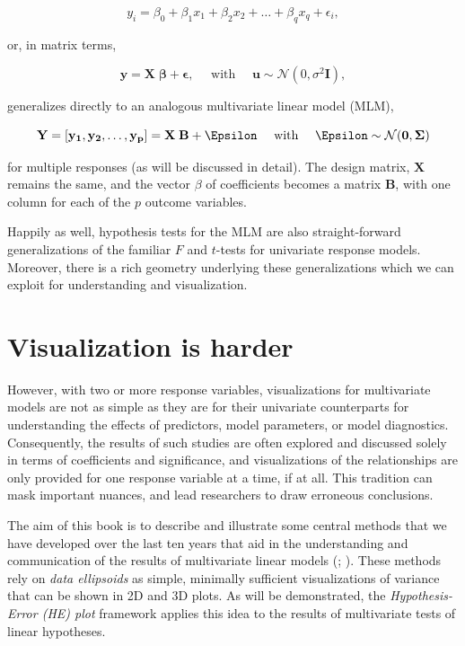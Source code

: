 \documentclass[
  letterpaper,
  10pt,
  krantz2]{krantz}
\begin{document}
\[y_i = \beta_0 + \beta_1 x_1 + \beta_2 x_2 + \dots + \beta_q x_q + \epsilon_i , \]

or, in matrix terms,

\[\mathbf{y} = \mathbf{X} \; \mathbf{\beta} + \mathbf{\epsilon}, \quad\mbox{   with   }\quad \mathbf{u} \sim \mathcal{N} (0, \sigma^2 \mathbf{I}) ,\]

generalizes directly to an analogous multivariate linear model (MLM),

\[\mathbf{Y} = [\mathbf{y_1}, \mathbf{y_2}, \dots, \mathbf{y_p}] = \mathbf{X} \; \mathbf{B} + \Epsilon \quad\mbox{   with   }\quad \Epsilon \sim \mathcal{N} (\mathbf{0}, \mathbf{\Sigma})\]

for multiple responses (as will be discussed in detail). The design
matrix, \(\mathbf{X}\) remains the same, and the vector \(\beta\) of
coefficients becomes a matrix \(\mathbf{B}\), with one column for each
of the \(p\) outcome variables.

Happily as well, hypothesis tests for the MLM are also straight-forward
generalizations of the familiar \(F\) and \(t\)-tests for univariate
response models. Moreover, there is a rich geometry underlying these
generalizations which we can exploit for understanding and
visualization.

\section{Visualization is harder}\label{visualization-is-harder}

However, with two or more response variables, visualizations for
multivariate models are not as simple as they are for their univariate
counterparts for understanding the effects of predictors, model
parameters, or model diagnostics. Consequently, the results of such
studies are often explored and discussed solely in terms of coefficients
and significance, and visualizations of the relationships are only
provided for one response variable at a time, if at all. This tradition
can mask important nuances, and lead researchers to draw erroneous
conclusions.

The aim of this book is to describe and illustrate some central methods
that we have developed over the last ten years that aid in the
understanding and communication of the results of multivariate linear
models (;
). These
methods rely on \emph{data ellipsoids} as simple, minimally sufficient
visualizations of variance that can be shown in 2D and 3D plots. As will
be demonstrated, the \emph{Hypothesis-Error (HE) plot} framework applies
this idea to the results of multivariate tests of linear hypotheses.
\end{document}
